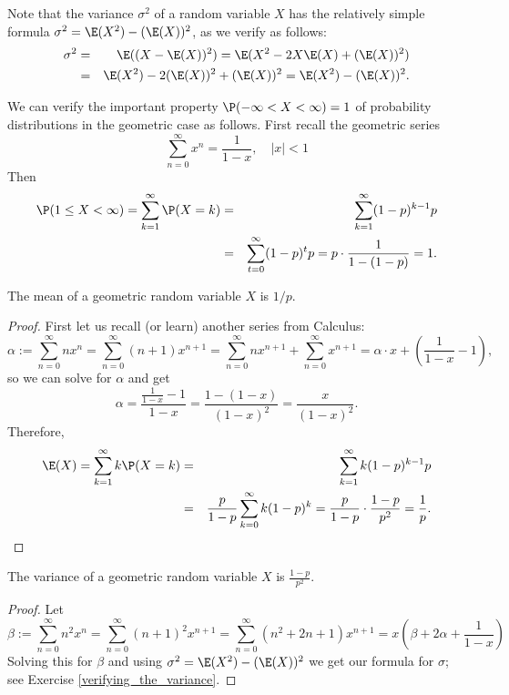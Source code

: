 

Note that the variance $\sigma^2$ of a random variable $X$ has the relatively simple formula $\sigma^2=\E(X^2)-(\E(X))^2$, as we verify as follows:
\begin{eqnarray*}
\sigma^2 &=& \E((X-\E(X))^2) = \E(X^2 - 2X\E(X) + (\E(X))^2)\\
&=& \E(X^2) - 2(\E(X))^2 + (\E(X))^2 = \E(X^2)-(\E(X))^2.
\end{eqnarray*}

We can verify the important property $\P(-\infty<X<\infty)=1$ of probability distributions in the geometric case as follows.
First recall the geometric series
\[
	\sum_{n=0}^\infty x^n = \frac{1}{1-x},\quad |x|<1
\]
Then
\begin{eqnarray*}
\P(1\le X<\infty) = \sum_{k=1}^\infty \P(X=k) &=& \sum_{k=1}^\infty (1-p)^{k-1}p\\
 &=& \sum_{t=0}^\infty (1-p)^t p = p\cdot \frac{1}{1-(1-p)} = 1.
\end{eqnarray*}
\begin{thm}
The mean of a geometric random variable $X$ is $1/p$.
\end{thm}
\begin{proof}
First let us recall (or learn) another series from Calculus:
\[
	\alpha := \sum_{n=0}^\infty n x^n = \sum_{n=0}^\infty (n+1) x^{n+1} = \sum_{n=0}^\infty n x^{n+1} + \sum_{n=0}^\infty x^{n+1} = \alpha\cdot x + \left(\frac1{1-x}-1\right),
\]
so we can solve for $\alpha$ and get
\[
\alpha = \frac{\frac1{1-x}-1}{1-x} = \frac{1-(1-x)}{(1-x)^2} = \frac{x}{(1-x)^2}.
\]
Therefore,
\begin{eqnarray*}
\E(X)=\sum_{k=1}^\infty k \P(X=k)&=&\sum_{k=1}^\infty k (1-p)^{k-1}p\\
&=&\frac{p}{1-p}\sum_{k=0}^\infty k(1-p)^k = \frac{p}{1-p} \cdot \frac{1-p}{p^2} = \frac1{p}.\qedhere
\end{eqnarray*}
\end{proof}
\begin{thm}\label{varGeom}
The variance of a geometric random variable $X$ is $\frac{1-p}{p^2}$.
\end{thm}
\begin{proof}
Let
\[
	\beta := \sum_{n=0}^\infty n^2 x^n = \sum_{n=0}^\infty (n+1)^2 x^{n+1} = \sum_{n=0}^\infty (n^2+2n+1) x^{n+1} = x\left(\beta+2\alpha+\frac{1}{1-x}\right)
\]
Solving this for $\beta$ and using $\sigma^2=\E(X^2)-(\E(X))^2$ we get our formula for $\sigma$; see Exercise \ref{verifying_the_variance}.
\end{proof}

